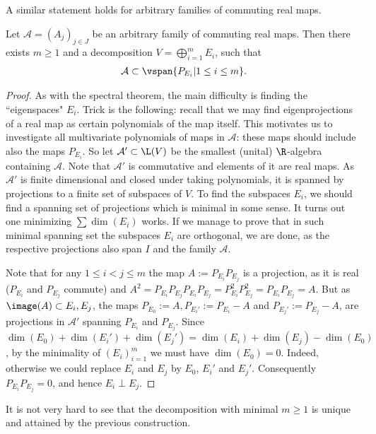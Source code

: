 A similar statement holds for arbitrary families of commuting real maps.

\begin{lause}\label{commuting_real_maps}
	Let $\mathcal{A} = (A_{j})_{j \in J}$ be an arbitrary family of commuting real maps. Then there exists $m \geq 1$ and a decomposition $V = \bigoplus_{i = 1}^{m} E_{i}$, such that
	\begin{align*}
		\mathcal{A} \subset \vspan \{P_{E_{i}} | 1 \leq i \leq m \}.
	\end{align*}
\end{lause}
\begin{proof}
	As with the spectral theorem, the main difficulty is finding the ``eigenspaces" $E_{i}$. Trick is the following: recall that we may find eigenprojections of a real map as certain polynomials of the map itself. This motivates us to investigate all multivariate polynomials of maps in $\mathcal{A}$: these maps should include also the maps $P_{E_{i}}$. So let $\mathcal{A}' \subset \L(V)$ be the smallest (unital) $\R$-algebra containing $\mathcal{A}$. Note that $\mathcal{A}'$ is commutative and elements of it are real maps. As $\mathcal{A}'$ is finite dimensional and closed under taking polynomials, it is spanned by projections to a finite set of subspaces of $V$. To find the subspaces $E_{i}$, we should find a spanning set of projections which is minimal in some sense. It turns out one minimizing $\sum \dim(E_{i})$ works. If we manage to prove that in such minimal spanning set the subspaces $E_{i}$ are orthogonal, we are done, as the respective projections also span $I$ and the family $\mathcal{A}$.

	Note that for any $1 \leq i < j \leq m$ the map $A := P_{E_{i}} P_{E_{j}}$ is a projection, as it is real ($P_{E_{i}}$ and $P_{E_{j}}$ commute) and $A^{2} = P_{E_{i}} P_{E_{j}} P_{E_{i}} P_{E_{j}} = P_{E_{i}}^2 P_{E_{j}}^2 = P_{E_{i}} P_{E_{j}} = A$. But as $\image(A) \subset E_{i}, E_{j}$, the maps $P_{E_{0}} := A, P_{E_{i}'} := P_{E_{i}} - A$ and $P_{E_{j}'} := P_{E_{j}} - A$, are projections in $\mathcal{A}'$ spanning $P_{E_{i}}$ and $P_{E_{j}}$. Since $\dim(E_{0}) + \dim(E_{i}') + \dim(E_{j}') = \dim(E_{i}) + \dim(E_{j}) - \dim(E_{0})$, by the minimality of $(E_{i})_{i = 1}^{m}$ we must have $\dim(E_{0}) = 0$. Indeed, otherwise we could replace $E_{i}$ and $E_{j}$ by $E_{0}$, $E_{i}'$ and $E_{j}'$. Consequently $P_{E_{i}} P_{E_{j}} = 0$, and hence $E_{i} \perp E_{j}$.
\end{proof}

It is not very hard to see that the decomposition with minimal $m \geq 1$ is unique and attained by the previous construction.

